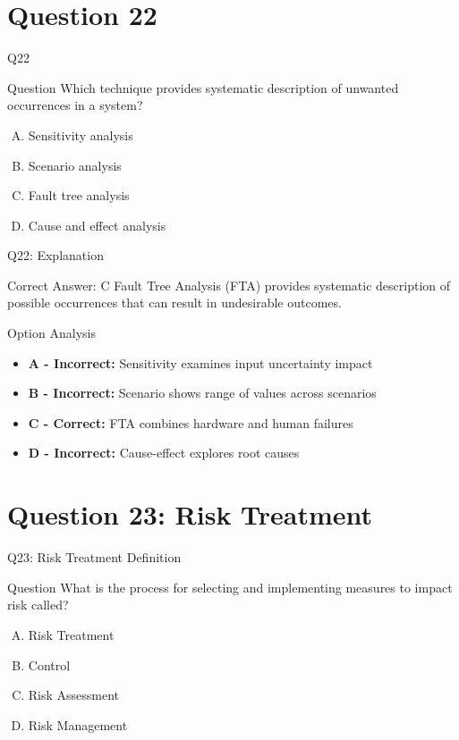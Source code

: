 \documentclass{beamer}
\begin{document}
	\section{Question 22}
	
	\begin{frame}{Q22}
		\begin{block}{Question}
			Which technique provides systematic description of unwanted occurrences in a system?
		\end{block}
		\begin{enumerate}[(A)]
			\item Sensitivity analysis
			\item Scenario analysis
			\item Fault tree analysis
			\item Cause and effect analysis
		\end{enumerate}
	\end{frame}
	
	\begin{frame}{Q22: Explanation}
		\begin{block}{Correct Answer: C}
			Fault Tree Analysis (FTA) provides systematic description of possible occurrences that can result in undesirable outcomes.
		\end{block}
		\begin{block}{Option Analysis}
			\begin{itemize}
				\item \textbf{A - Incorrect:} Sensitivity examines input uncertainty impact
				\item \textbf{B - Incorrect:} Scenario shows range of values across scenarios
				\item \textbf{C - Correct:} FTA combines hardware and human failures
				\item \textbf{D - Incorrect:} Cause-effect explores root causes
			\end{itemize}
		\end{block}
	\end{frame}
	
	\section{Question 23: Risk Treatment}
	
	\begin{frame}{Q23: Risk Treatment Definition}
		\begin{block}{Question}
			What is the process for selecting and implementing measures to impact risk called?
		\end{block}
		\begin{enumerate}[(A)]
			\item Risk Treatment
			\item Control
			\item Risk Assessment
			\item Risk Management
		\end{enumerate}
	\end{frame}
	
\end{document}
